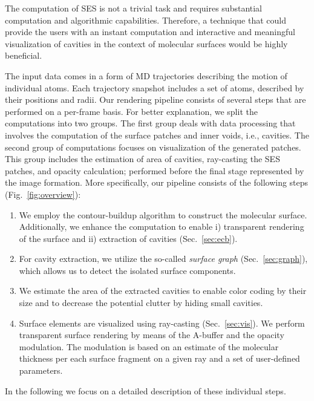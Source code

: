 
The computation of SES is not a trivial task and requires substantial computation and algorithmic capabilities. 
Therefore, a technique that could provide the users with an instant computation and interactive and meaningful visualization of cavities in the context of molecular surfaces would be highly beneficial.

The input data comes in a form of MD trajectories describing the motion of individual atoms. 
Each trajectory snapshot includes a set of atoms, described by their positions and radii. 
Our rendering pipeline consists of several steps that are performed on a per-frame basis. 
For better explanation, we split the computations into two groups. 
The first group deals with data processing that involves the computation of the surface patches and inner voids, i.e., cavities.
The second group of computations focuses on visualization of the generated patches. 
This group includes the estimation of area of cavities, ray-casting the SES patches, and opacity calculation; performed before the final stage represented by the image formation. 
More specifically, our pipeline consists of the following steps (Fig.~\ref{fig:overview}):
	\begin{enumerate}
	  \item We employ the contour-buildup algorithm to construct the molecular surface. Additionally, we enhance the computation to enable i) transparent rendering of the surface and ii) extraction of cavities (Sec.~\ref{sec:ecb}).
		\item For cavity extraction, we utilize the so-called \textit{surface graph} (Sec.~\ref{sec:graph}), which allows us to detect the isolated surface components.
		\item We estimate the area of the extracted cavities to enable color coding by their size and to decrease the potential clutter by hiding small cavities.
		\item Surface elements are visualized using ray-casting (Sec.~\ref{sec:vis}). We perform transparent surface rendering by means of the A-buffer and the opacity modulation. The modulation is based on an estimate of the molecular thickness per each surface fragment on a given ray and a set of user-defined parameters.
	\end{enumerate}
	
In the following we focus on a detailed description of these individual steps.